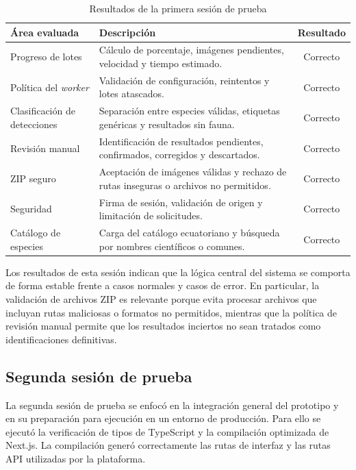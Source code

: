 \begin{table}[H]
\centering
\caption{Resultados de la primera sesión de prueba}
\label{tab:primera_sesion_prueba}
\begin{tabularx}{\textwidth}{lXc}
\toprule
\textbf{Área evaluada} & \textbf{Descripción} & \textbf{Resultado} \\
\midrule
Progreso de lotes & Cálculo de porcentaje, imágenes pendientes, velocidad y tiempo estimado. & Correcto \\
Política del \textit{worker} & Validación de configuración, reintentos y lotes atascados. & Correcto \\
Clasificación de detecciones & Separación entre especies válidas, etiquetas genéricas y resultados sin fauna. & Correcto \\
Revisión manual & Identificación de resultados pendientes, confirmados, corregidos y descartados. & Correcto \\
ZIP seguro & Aceptación de imágenes válidas y rechazo de rutas inseguras o archivos no permitidos. & Correcto \\
Seguridad & Firma de sesión, validación de origen y limitación de solicitudes. & Correcto \\
Catálogo de especies & Carga del catálogo ecuatoriano y búsqueda por nombres científicos o comunes. & Correcto \\
\bottomrule
\end{tabularx}
\end{table}

Los resultados de esta sesión indican que la lógica central del sistema se comporta de forma estable frente a casos normales y casos de error. En particular, la validación de archivos ZIP es relevante porque evita procesar archivos que incluyan rutas maliciosas o formatos no permitidos, mientras que la política de revisión manual permite que los resultados inciertos no sean tratados como identificaciones definitivas.

\subsection{Segunda sesión de prueba}
\label{subsec:segunda_sesion_prueba}

La segunda sesión de prueba se enfocó en la integración general del prototipo y en su preparación para ejecución en un entorno de producción. Para ello se ejecutó la verificación de tipos de TypeScript y la compilación optimizada de Next.js. La compilación generó correctamente las rutas de interfaz y las rutas API utilizadas por la plataforma.

